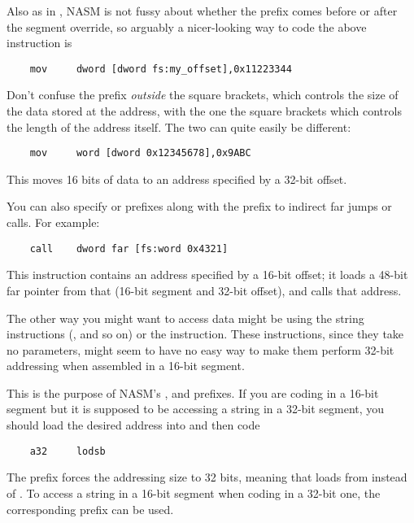 Also as in , NASM is not fussy about whether the
 prefix comes before or after the segment override, so
arguably a nicer-looking way to code the above instruction is

\begin{lstlisting}
    mov     dword [dword fs:my_offset],0x11223344
\end{lstlisting}

Don't confuse the  prefix \emph{outside} the square brackets,
which controls the size of the data stored at the address, with the
one  the square brackets which controls the length of the
address itself. The two can quite easily be different:

\begin{lstlisting}
    mov     word [dword 0x12345678],0x9ABC
\end{lstlisting}

This moves 16 bits of data to an address specified by a 32-bit
offset.

You can also specify  or  prefixes along with the
 prefix to indirect far jumps or calls. For example:

\begin{lstlisting}
    call    dword far [fs:word 0x4321]
\end{lstlisting}

This instruction contains an address specified by a 16-bit offset;
it loads a 48-bit far pointer from that (16-bit segment and 32-bit
offset), and calls that address.


The other way you might want to access data might be using the
string instructions (,  and so on) or the
 instruction. These instructions, since they take no
parameters, might seem to have no easy way to make them perform
32-bit addressing when assembled in a 16-bit segment.

This is the purpose of NASM's ,  and
 prefixes. If you are coding  in a 16-bit
segment but it is supposed to be accessing a string in a 32-bit segment,
you should load the desired address into  and then code

\begin{lstlisting}
    a32     lodsb
\end{lstlisting}

The prefix forces the addressing size to 32 bits, meaning that
 loads from \code{[DS:ESI]} instead of \code{[DS:SI]}.
To access a string in a 16-bit segment when coding in a 32-bit one,
the corresponding  prefix can be used.

